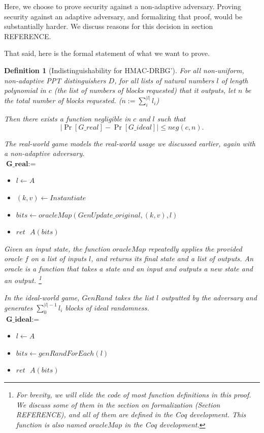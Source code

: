 \documentclass[12pt,lot, lof]{puthesis}
\newenvironment{game}
{ \begin{itemize}[noitemsep,nolistsep] 
}
{ \end{itemize}                  }
\newcommand{\s} {\textrm{ }}
\newcommand{\lar}{\leftarrow}
\newtheorem{dfn}[thm]{Definition}
\begin{document}
Here, we choose to prove security against a non-adaptive adversary. Proving security against an adaptive adversary, and formalizing that proof, would be substantially harder. We discuss reasons for this decision in section REFERENCE.

That said, here is the formal statement of what we want to prove.

\begin{dfn}[Indistinguishability for HMAC-DRBG'] \label{def:indist}
For all non-uniform, non-adaptive PPT distinguishers $D$, for all lists of natural numbers $l$ of length polynomial in $c$ (the list of numbers of blocks requested) that it outputs, let $n$ be the total number of blocks requested. ($n := \sum_i^{|l|} l_i$) 

Then there exists a function negligible in $c$ and $l$ such that
$$|\Pr[G\_real] - \Pr[G\_ideal]| \leq neg(c, n).$$

The real-world game models the real-world usage we discussed earlier, again with a non-adaptive adversary.\\

$\textbf{G\_real} := $
\begin{game}
\item[] $l \leftarrow A$
\item[] $(k,v) \leftarrow Instantiate$
\item[] $bits \lar oracleMap(GenUpdate\_original,(k, v),l)$
\item[] $ret \s A(bits)$ \\
\end{game}

Given an input state, the function $oracleMap$ repeatedly applies the provided oracle $f$ on a list of inputs $l$, and returns its final state and a list of outputs. An oracle is a function that takes a state and an input and outputs a new state and an output. \footnote{For brevity, we will elide the code of most function definitions in this proof. We discuss some of them in the section on formalization (Section REFERENCE), and all of them are defined in the Coq development. This function is also named $oracleMap$ in the Coq development.}

In the ideal-world game, $GenRand$ takes the list $l$ outputted by the adversary and generates $\sum_0^{|l|-1} l_i$ blocks of ideal randomness.\\

$\textbf{G\_ideal} := $
\begin{game}
\item[] $l \leftarrow A$ 
\item[] $bits \leftarrow genRandForEach(l)$
\item[] $ret \s A(bits)$ \\
\end{game}

\end{dfn}
\end{document}
